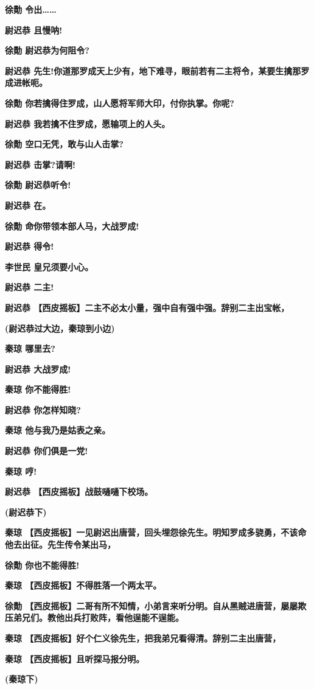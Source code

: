 \textbf{徐勣 令出\ldots{}\ldots{}}

\textbf{尉迟恭 且慢呐!}

\textbf{徐勣 尉迟恭为何阻令?}

\textbf{尉迟恭
先生!你道那罗成天上少有，地下难寻，眼前若有二主将令，某要生擒那罗成进帐呃。}

\textbf{徐勣 你若擒得住罗成，山人愿将军师大印，付你执掌。你呢?}

\textbf{尉迟恭 我若擒不住罗成，愿输项上的人头。}

\textbf{徐勣 空口无凭，敢与山人击掌?}

\textbf{尉迟恭 击掌?请啊!}

\textbf{徐勣 尉迟恭听令!}

\textbf{尉迟恭 在。}

\textbf{徐勣 命你带领本部人马，大战罗成!}

\textbf{尉迟恭 得令!}

\textbf{李世民 皇兄须要小心。}

\textbf{尉迟恭 二主!}

\textbf{尉迟恭
【西皮摇板】二主不必太小量，强中自有强中强。辞别二主出宝帐，}

\textbf{(尉迟恭过大边，秦琼到小边)}

\textbf{秦琼 哪里去?}

\textbf{尉迟恭 大战罗成!}

\textbf{秦琼 你不能得胜!}

\textbf{尉迟恭 你怎样知晓?}

\textbf{秦琼 他与我乃是姑表之亲。}

\textbf{尉迟恭 你们俱是一党!}

\textbf{秦琼 哼!}

\textbf{尉迟恭 【西皮摇板】战鼓嗵嗵下校场。}

\textbf{(尉迟恭下)}

\textbf{秦琼
【西皮摇板】一见尉迟出唐营，回头埋怨徐先生。明知罗成多骁勇，不该命他去出征。先生传令某出马，}

\textbf{徐勣 你也不能得胜!}

\textbf{秦琼 【西皮摇板】不得胜落一个两太平。}

\textbf{徐勣
【西皮摇板】二哥有所不知情，小弟言来听分明。自从黑贼进唐营，屡屡欺压弟兄们。教他出兵打败阵，看他逞能不逞能。}

\textbf{秦琼
【西皮摇板】好个仁义徐先生，把我弟兄看得清。辞别二主出唐营，}

\textbf{秦琼 【西皮摇板】且听探马报分明。}

\textbf{(秦琼下)}

